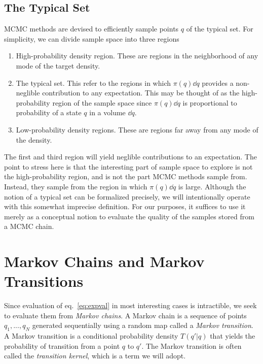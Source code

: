 \subsection{The Typical Set}
MCMC methods are devised to efficiently sample points $q$ of the typical set. For simplicity, we can divide
sample space into three regions
\begin{enumerate}
    \item High-probability density region. These are regions in the neighborhood of any mode of the target density.
    \item The typical set. This refer to the regions in which $\pi(q) \dd q$ provides a non-neglible contribution
    to any expectation. This may be thought of as the high-probability region of the sample space
    since $\pi(q) \dd q$ is proportional to probability of a state $q$ in a volume $\dd q$. 
    \item Low-probability density regions. These are regions far away from any mode of the density.
\end{enumerate}
The first and third region will yield neglible contributions to an expectation.
The point to stress here is that the interesting part of sample space to explore is not the high-probability region, and is
not the part MCMC methods sample from. Instead, they sample from the region in which $\pi(q) \dd q$ is large.
Although the notion of a typical set can be formalized precisely, we will intentionally 
operate with this somewhat imprecise definition. For our purposes, it suffices to use it merely as
a conceptual notion to evaluate the quality of the samples stored from a MCMC chain. 


\section{Markov Chains and Markov Transitions}
Since evaluation of eq.~\eqref{eq:expval} in most interesting cases is intractible, we seek to evaluate them
from \textit{Markov chains}. A Markov chain is a sequence of points $q_1, ..., q_N$ generated sequentially
using a random map called a \textit{Markov transition}. A Markov transition is a conditional probability density
$T(q'|q)$ that yields the probability of transition from a point $q$ to $q'$. The Markov transition is often called
the \textit{transition kernel}, which is a term we will adopt. 

